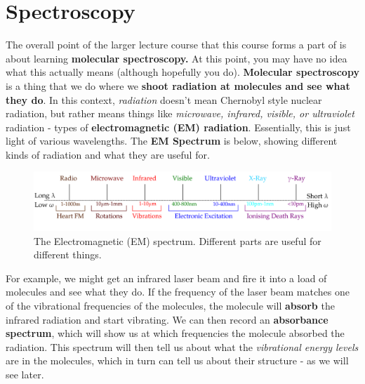 \documentclass{memoir}[11pt,oneside,a4paper,openany]
\begin{document}
\section{Spectroscopy}
The overall point of the larger lecture course that this course forms a part of is about learning \textbf{molecular spectroscopy.} At this point, you may have no idea what this actually means (although hopefully you do). \textbf{Molecular spectroscopy} is a thing that we do where we \textbf{shoot radiation at molecules and see what they do}. In this context, \emph{radiation} doesn't mean Chernobyl style nuclear radiation, but rather means things like \emph{microwave, infrared, visible, or ultraviolet} radiation - types of \textbf{electromagnetic (EM) radiation}. Essentially, this is just light of various wavelengths. The \textbf{EM Spectrum} is below, showing different kinds of radiation and what they are useful for. 

\begin{figure}[h]
\centering
	\includegraphics[width=\textwidth]{EM_spectrum}
	\caption{The Electromagnetic (EM) spectrum. Different parts are useful for different things.}
\end{figure}

For example, we might get an infrared laser beam and fire it into a load of molecules and see what they do. If the frequency of the laser beam matches one of the vibrational frequencies of the molecules, the molecule will \textbf{absorb} the infrared radiation and start vibrating. We can then record an \textbf{absorbance spectrum}, which will show us at which frequencies the molecule absorbed the radiation. This spectrum will then tell us about what the \emph{vibrational energy levels} are in the molecules, which in turn can tell us about their structure - as we will see later.
\end{document}
